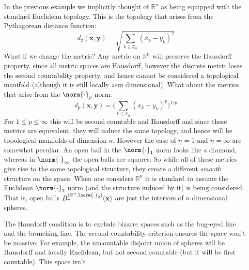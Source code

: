         \begin{example}
            In the previous example we implicitly thought of $\mathbb{R}^{n}$ as
            being equipped with the standard Euclidean topology. This is the
            topology that arises from the Pythagorean distance function:
            \begin{equation}
                d_{2}(\mathbf{x},\mathbf{y})=
                \sqrt{\sum_{k\in\mathbb{Z}_{n}}(x_{k}-y_{k})^{2}}
            \end{equation}
            What if we change the metric? Any metric on $\mathbb{R}^{n}$ will
            preserve the Hausdorff property, since all metric spaces are
            Hausdorff, however the discrete metric loses the second countability
            property, and hence cannot be considered a topological manifold
            (although it is still locally \textit{zero} dimensional). What about
            the metrics that arise from the $\norm{\cdot}_{p}$ norm:
            \begin{equation}
                d_{p}(\mathbf{x},\mathbf{y})=
                \Big(\sum_{k\in\mathbb{Z}_{n}}(x_{k}-y_{k})^{p}\Big)^{1/p}
            \end{equation}
            For $1\leq{p}\leq\infty$ this will be second countable and Hausdorff
            and since these metrics are equivalent, they will induce the same
            topology, and hence will be topological manifolds of dimension $n$.
            However the case of $n=1$ and $n=\infty$ are somewhat peculiar. An
            open ball in the $\norm{\cdot}_{1}$ norm looks like a diamond,
            whereas in $\norm{\cdot}_{\infty}$ the open balls are squares. So
            while all of these metrics give rise to the same topological
            structure, they create a different \textit{smooth} structure on the
            space. When one considers $\mathbb{R}^{n}$ it is standard to assume
            the Euclidean $\norm{\cdot}_{2}$ norm (and the structure induced by
            it) is being considered. That is, open balls
            $B_{r}^{(\mathbb{R}^{n},\norm{\cdot}_{2})}(\mathbf{x})$ are just the
            interiors of $n$ dimensional spheres.
        \end{example}
        The Hausdorff condition is to exclude bizarre spaces such as the
        bug-eyed line and the branching line. The second countability criterion
        ensures the space won't be massive. For example, the uncountable
        disjoint union of spheres will be Hausdorff and locally Euclidean, but
        not second countable (but it will be first countable). This space isn't
